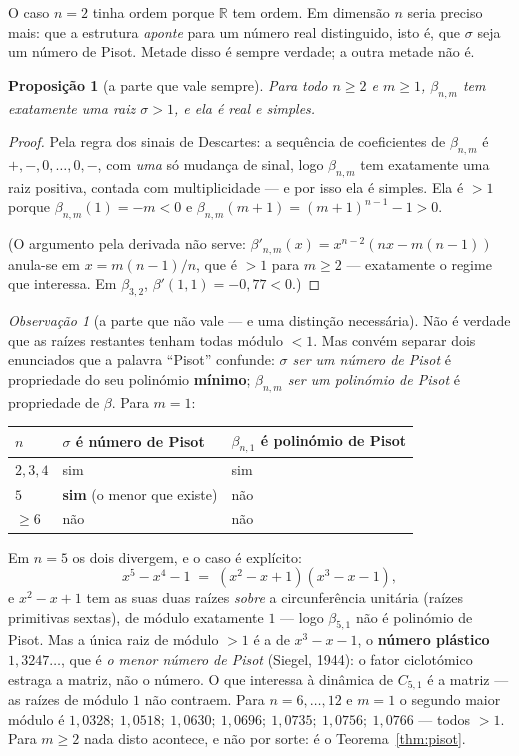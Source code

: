 \documentclass[11pt,a4paper]{article}
\theoremstyle{plain}
\newtheorem{proposicao}[teorema]{Proposição}
\theoremstyle{definition}
\theoremstyle{remark}
\newtheorem{obs}[teorema]{Observação}
\newcommand{\R}{\mathbb{R}}
\providecommand{\Comp}[2]{C_{#1,#2}}
\begin{document}
O caso $n=2$ tinha ordem porque $\R$ tem ordem. Em dimensão $n$ seria preciso mais: que a
estrutura \emph{aponte} para um número real distinguido, isto é, que $\sigma$ seja um número de
Pisot. Metade disso é sempre verdade; a outra metade não é.

\begin{proposicao}[a parte que vale sempre]\label{prop:dominante}
Para todo $n\geq2$ e $m\geq1$, $\beta_{n,m}$ tem exatamente uma raiz $\sigma>1$, e ela é real e
simples.
\end{proposicao}

\begin{proof}
Pela regra dos sinais de Descartes: a sequência de coeficientes de $\beta_{n,m}$ é
$+,-,0,\dots,0,-$, com \emph{uma} só mudança de sinal, logo $\beta_{n,m}$ tem exatamente uma raiz
positiva, contada com multiplicidade --- e por isso ela é simples. Ela é $>1$ porque
$\beta_{n,m}(1) = -m < 0$ e $\beta_{n,m}(m+1) = (m+1)^{n-1}-1 > 0$.

(O argumento pela derivada não serve: $\beta'_{n,m}(x) = x^{n-2}(nx-m(n-1))$ anula-se em
$x = m(n-1)/n$, que é $>1$ para $m\geq2$ --- exatamente o regime que interessa. Em $\beta_{3,2}$,
$\beta'(1{,}1) = -0{,}77 < 0$.)
\end{proof}

\begin{obs}[a parte que não vale --- e uma distinção necessária]\label{obs:naopisot}
Não é verdade que as raízes restantes tenham todas módulo $<1$. Mas convém separar dois enunciados
que a palavra ``Pisot'' confunde: \emph{$\sigma$ ser um número de Pisot} é propriedade do seu
polinómio \textbf{mínimo}; \emph{$\beta_{n,m}$ ser um polinómio de Pisot} é propriedade de
$\beta$. Para $m=1$:
\begin{center}\small
\begin{tabular}{lll}
\hline
$n$ & $\sigma$ é número de Pisot & $\beta_{n,1}$ é polinómio de Pisot \\ \hline
$2,3,4$ & sim & sim \\
$5$ & \textbf{sim} (o menor que existe) & não \\
$\geq 6$ & não & não \\
\hline
\end{tabular}
\end{center}
\noindent Em $n=5$ os dois divergem, e o caso é explícito:
\[
  x^5-x^4-1 \;=\; (x^2-x+1)(x^3-x-1),
\]
e $x^2-x+1$ tem as suas duas raízes \emph{sobre} a circunferência unitária (raízes primitivas
sextas), de módulo exatamente $1$ --- logo $\beta_{5,1}$ não é polinómio de Pisot. Mas a única raiz
de módulo $>1$ é a de $x^3-x-1$, o \textbf{número plástico} $1{,}3247\ldots$, que é
\emph{o menor número de Pisot} (Siegel, 1944): o fator ciclotómico estraga a matriz, não o número.
O que interessa à dinâmica de $\Comp{5}{1}$ é a matriz --- as raízes de módulo $1$ não contraem. Para $n=6,\dots,12$ e $m=1$ o segundo maior módulo
é $1{,}0328;\ 1{,}0518;\ 1{,}0630;\ 1{,}0696;\ 1{,}0735;\ 1{,}0756;\ 1{,}0766$ --- todos $>1$.
Para $m\geq2$ nada disto acontece, e não por sorte: é o Teorema~\ref{thm:pisot}.
\end{obs}
\end{document}
